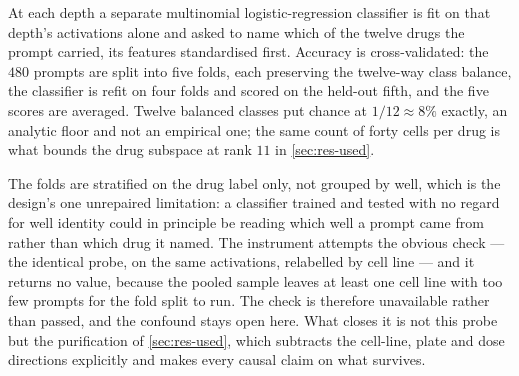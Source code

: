 At each depth a separate multinomial logistic-regression classifier is fit on
that depth's activations alone and asked to name which of the twelve drugs the
prompt carried, its features standardised first. Accuracy is cross-validated:
the $480$ prompts are split into five folds, each preserving the twelve-way
class balance, the classifier is refit on four folds and scored on the held-out
fifth, and the five scores are averaged. Twelve balanced classes put chance at
$1/12 \approx 8\%$ exactly, an analytic floor and not an empirical one; the same
count of forty cells per drug is what bounds the drug subspace at rank $11$ in
\cref{sec:res-used}.

The folds are stratified on the drug label only, not grouped by well, which is
the design's one unrepaired limitation: a classifier trained and tested with no
regard for well identity could in principle be reading which well a prompt came
from rather than which drug it named. The instrument attempts the obvious check
--- the identical probe, on the same activations, relabelled by cell line ---
and it returns no value, because the pooled sample leaves at least one cell
line with too few prompts for the fold split to run. The check is therefore
unavailable rather than passed, and the confound stays open here. What closes
it is not this probe but the purification of \cref{sec:res-used}, which
subtracts the cell-line, plate and dose directions explicitly and makes every
causal claim on what survives.

